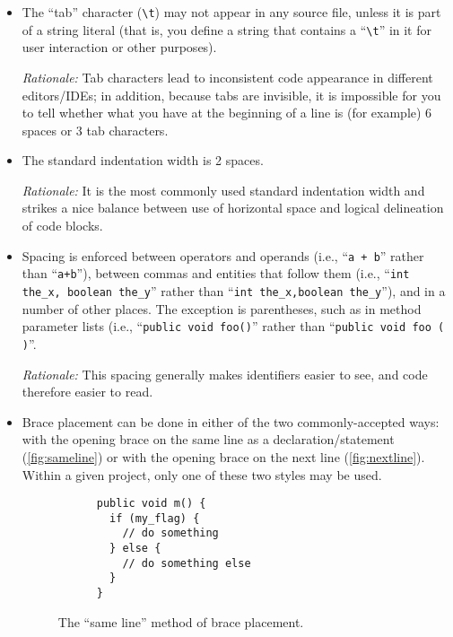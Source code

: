 \begin{itemize}

    \item 
    The ``tab'' character (\texttt{\textbackslash{}t}) may not appear in any source file, unless it is part of a string literal (that is, you define a string that contains a ``\texttt{\textbackslash{}t}'' in it for user interaction or other purposes). 

    \emph{Rationale:} Tab characters
lead to inconsistent code appearance in different editors/IDEs; in
addition, because tabs are invisible, it is impossible for you to tell
whether what you have at the beginning of a line is (for example) 6
spaces or 3 tab characters.

    \item 
    The standard indentation width is 2 spaces. 
    
    \emph{Rationale:} It is the most
commonly used standard indentation width and strikes a nice balance
between use of horizontal space and logical delineation of code
blocks.

    \item 
    Spacing is enforced between operators and operands (i.e., ``\texttt{a +
  b}'' rather than ``\texttt{a+b}''), between commas and entities that
follow them (i.e., ``\texttt{int the\_x, boolean the\_y}'' rather than
``\texttt{int the\_x,boolean the\_y}''), and in a number of other
places. The exception is parentheses, such as in method parameter
lists (i.e., ``\texttt{public void foo()}'' rather than ``\texttt{public
  void foo ( )}''. 
  
    \emph{Rationale:} This spacing generally makes identifiers
easier to see, and code therefore easier to read.

    \item 
    Brace placement can be done in either of the two commonly-accepted
ways: with the opening brace on the same line as a
declaration/statement (\autoref{fig:sameline}) or with the opening brace on the next
line (\autoref{fig:nextline}). Within a given project, only one of these two styles may be used. 


    \begin{figure}
    \begin{center}
    \begin{minipage}{0.5\textwidth}
    \small
    \begin{lstlisting}
      public void m() {
        if (my_flag) {
          // do something
        } else { 
          // do something else
        }
      }
    \end{lstlisting}
    \vspace{-12pt}
    \end{minipage}
    \end{center}
    \caption{The ``same line'' method of brace placement.}
    \label{fig:sameline}
    \vspace{18pt}
    \end{figure}
    

\end{itemize}

